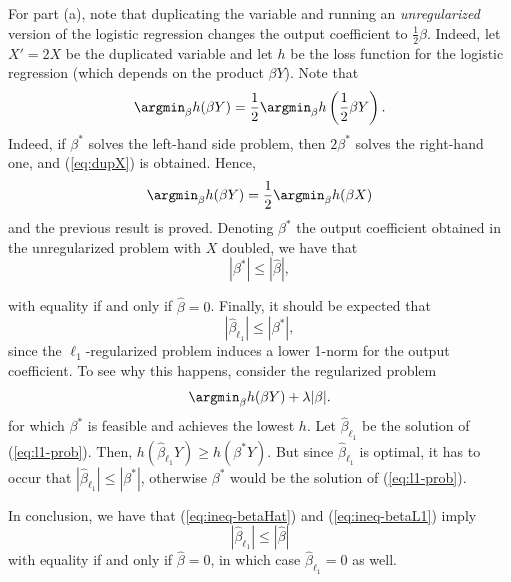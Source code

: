 \documentclass[11pt, english, twocolumn]{article}
\begin{document}
For part (a), note that duplicating the variable and running an \textit{unregularized} version of the logistic regression changes the output coefficient to $\frac{1}{2}\hat{\beta}$. Indeed, let $X' = 2X$ be the duplicated variable and let $h$ be the loss function for the logistic regression (which depends on the product $\beta Y$). Note that
	\begin{equation} \label{eq:dupX}
		\argmin_{\beta} h(\beta Y) = \frac{1}{2}\argmin_{\beta} h\left(\frac{1}{2}\beta Y\right).
	\end{equation}
Indeed, if $\beta^{*}$ solves the left-hand side problem, then $2\beta^{*}$ solves the right-hand one, and (\ref{eq:dupX}) is obtained. Hence,
	$$\argmin_{\beta} h(\beta Y) = \frac{1}{2}\argmin_{\beta}h(\beta X)$$
and the previous result is proved. Denoting $\beta^{*}$ the output coefficient obtained in the unregularized problem with $X$ doubled, we have that
	\begin{equation}\label{eq:ineq-betaHat}
		 \left|\beta^{*}\right| \leq \left|\hat{\beta}\right|,
	\end{equation}

with equality if and only if $\hat{\beta} = 0$. Finally, it should be expected that
	\begin{equation}\label{eq:ineq-betaL1}
		\left|\hat{\beta}_{\ell_{1}}\right| \leq \left|\beta^{*}\right|,
	\end{equation}
since the $\ell_{1}$-regularized problem induces a lower 1-norm for the output coefficient. To see why this happens, consider the regularized problem
	\begin{equation} \label{eq:l1-prob}
		\argmin_{\beta} h(\beta Y) + \lambda |\beta|.
	\end{equation}
for which $\beta^{*}$ is feasible and achieves the lowest $h$. Let $\hat{\beta}_{\ell_{1}}$ be the solution of (\ref{eq:l1-prob}). Then, $h\left(\hat{\beta}_{\ell_{1}}Y\right) \geq h\left(\beta^{*}Y\right)$. But since $\hat{\beta}_{\ell_{1}}$ is optimal, it has to occur that $\left|\hat{\beta}_{\ell_{1}}\right| \leq \left|\beta^{*}\right|$, otherwise $\beta^{*}$ would be the solution of (\ref{eq:l1-prob}).

In conclusion, we have that (\ref{eq:ineq-betaHat}) and (\ref{eq:ineq-betaL1}) imply
	$$\left|\hat{\beta}_{\ell_{1}}\right| \leq \left|\hat{\beta}\right|$$
with equality if and only if $\hat{\beta} = 0$, in which case $\hat{\beta}_{\ell_{1}} = 0$ as well.\\[1ex]
\end{document}
